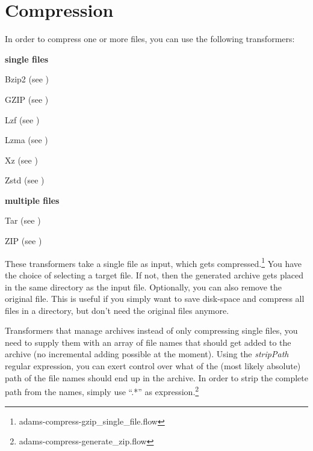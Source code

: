 \documentclass[a4paper]{book}
\begin{document}
\chapter{Compression}
In order to compress one or more files, you can use the following transformers:
\begin{tight_itemize}
	\item \textbf{single files}
	\begin{tight_itemize}
		\item Bzip2 (see \cite{bzip2})
		\item GZIP (see \cite{gzip})
		\item Lzf (see \cite{lzf})
		\item Lzma (see \cite{lzma})
		\item Xz (see \cite{xz})
		\item Zstd (see \cite{zstd})
	\end{tight_itemize}
	\item \textbf{multiple files}
	\begin{tight_itemize}
		\item Tar (see \cite{tar})
		\item ZIP (see \cite{zip})
	\end{tight_itemize}
\end{tight_itemize}

These transformers take a single file as input, which gets 
compressed.\footnote{adams-compress-gzip\_single\_file.flow}
You have the choice of selecting a target file. If not, then the generated
archive gets placed in the same directory as the input file. Optionally,
you can also remove the original file. This is useful if you simply want
to save disk-space and compress all files in a directory, but don't need
the original files anymore.

Transformers that manage archives instead of only compressing single files,
you need to supply them with an array of file names that should get added
to the archive (no incremental adding possible at the moment). Using the
\textit{stripPath} regular expression, you can exert control over what of
the (most likely absolute) path of the file names should end up in the
archive. In order to strip the complete path from the names, simply use
``.*'' as expression.\footnote{adams-compress-generate\_zip.flow}


\end{document}
